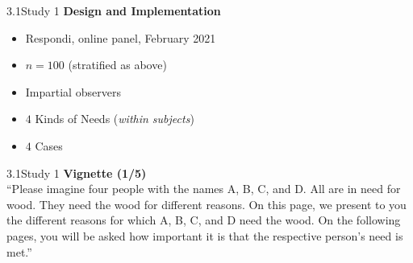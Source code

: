 \documentclass[xcolor=table,9pt,aspectratio=169]{beamer}
\begin{document}
\begin{frame}{\vspace*{10mm}3.1\hspace*{1em}Study 1}
\textbf{Design and Implementation}\\
\medskip
\begin{itemize}
   \item Respondi, online panel, February 2021
   \item $n=100$ (stratified as above)
   \item Impartial observers
   \item $4$ Kinds of Needs (\textit{within subjects})
   \item $4$ Cases
\end{itemize}
\end{frame}


\begin{frame}{\vspace*{10mm}3.1\hspace*{1em}Study 1}
\textbf{Vignette (1/5)}\\
\medskip
\enquote{Please imagine four people with the names A, B, C, and D.
All are in need for wood.
They need the wood for different reasons.
On this page, we present to you the different reasons for which A, B, C, and D need the wood.
On the following pages, you will be asked how important it is that the respective person's need is met.}
\end{frame}
\end{document}
